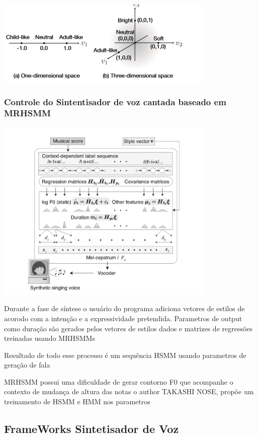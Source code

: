 		\includegraphics{exemploHMM.png}
		
		\subsubsection{Controle do Sintentisador de voz cantada baseado em MRHSMM}
		
		\includegraphics{esquemaHMM.png}
		
		Durante a fase de síntese o usuário do programa adiciona vetores de estilos de acorodo com a intenção e a expressividade pretendida.
		Parametros de output como duração são gerados pelos vetores de estilos dados e matrizes de regressões treinadas usando MRHSMMs
		
		Resultado de todo esse processo é um sequência HSMM usando parametros de geração de fala
		
		MRHSMM possui uma dificuldade de gerar contorno F0 que acompanhe o contexto de mudança de altura das notas o author TAKASHI NOSE, propõe um treinamento de HSMM e HMM nos parametros 
		
	
	\subsection{FrameWorks Sintetisador de Voz}
	
